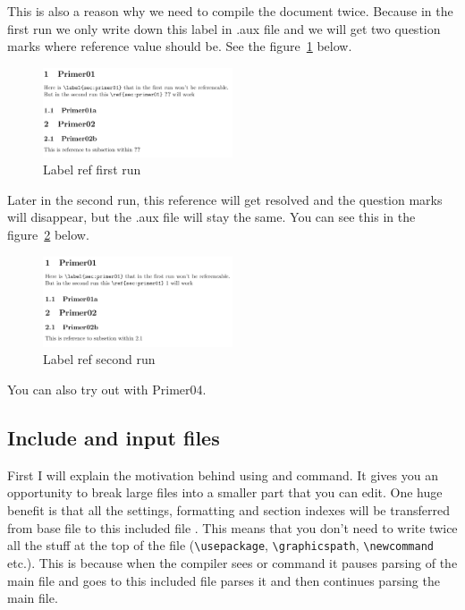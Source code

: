 \documentclass[a4paper,oneside,8pt]{extarticle}
\begin{document}
This is also a reason why we need to compile the document twice. Because in the first run we only write down this label in .aux file and we will get two question marks where reference value should be. See the figure~\ref{fig:LabelRef01} below.
\begin{figure}[h]
    \centering
    \includegraphics[width=0.5\textwidth]{LabelRef01.png}
    \caption{Label ref first run}
    \label{fig:LabelRef01}
\end{figure}

Later in the second run, this reference will get resolved and the question marks will disappear, but the .aux file will stay the same. You can see this in the figure~\ref{fig:LabelRef02} below.
\begin{figure}[H]
    \centering
    \includegraphics[width=0.5\textwidth]{LabelRef02.png}
    \caption{Label ref second run}
    \label{fig:LabelRef02}
\end{figure}

You can also try out with Primer04. 

\subsection{Include and input files}
First I will explain the motivation behind using \verb|| and \verb|| command. It gives you an opportunity to break large files into a smaller part that you can edit. One huge benefit is that all the settings, formatting and section indexes will be transferred from base file to this included file \cite{Include_input}. This means that you don't need to write twice all the stuff at the top of the file (\verb|\usepackage|, \verb|\graphicspath|, \verb|\newcommand| etc.). This is because when the compiler sees \verb|| or \verb|| command it pauses parsing of the main file and goes to this included file parses it and then continues parsing the main file. \\
\end{document}
